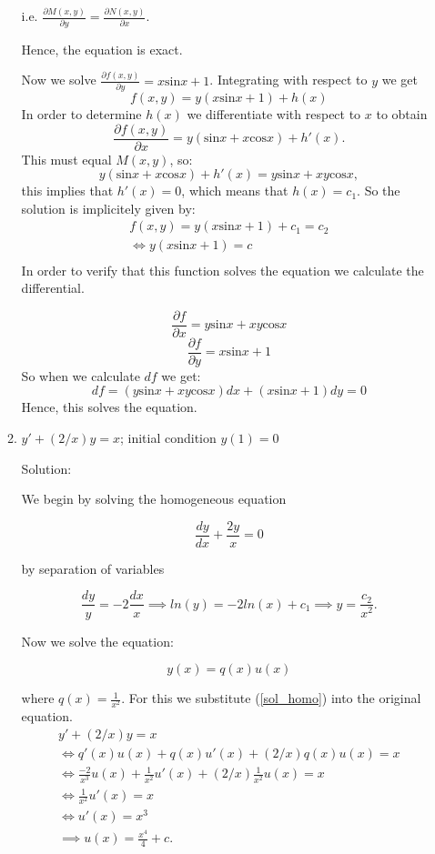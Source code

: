\documentclass{article}
\begin{document}
\begin{enumerate}
\begin{enumerate}
		i.e. $\frac{\partial M(x,y)}{\partial y} = \frac{\partial N(x,y)}{\partial x}$.

		Hence, the equation is exact.

		Now we solve $\frac{\partial f(x,y)}{\partial y} = x\text{sin}x + 1$. Integrating with respect to $y$ we get
		\[f(x,y) = y(x\text{sin}x +1) + h(x)\]
		In order to determine $h(x)$ we differentiate with
		respect to $x$ to obtain
		\[\frac{\partial f(x,y)}{\partial x} = y(\text{sin}x+x\text{cos}x) + h'(x).\]
		This must equal $M(x,y)$, so:
		\[y(\text{sin}x+x\text{cos}x) + h'(x) = y\text{sin}x + xy\text{cos}x,\]
		this implies that $h'(x)=0$, which means that $h(x) = c_1$.
		So the solution is implicitely given by:
		\begin{align*}
			f(x,y) = y(x\text{sin}x +1) + c_1 = c_2 \\
			\iff y(x\text{sin}x +1) = c \\
		\end{align*}
		In order to verify that this function solves the equation we calculate the differential.

		\[\frac{\partial f}{\partial x} = y\text{sin}x + xy\text{cos}x\]
		\[\frac{\partial f}{\partial y} = x\text{sin}x + 1\]
		So when we calculate $df$ we get:
		\[ df = (y\text{sin}x + xy\text{cos}x)dx + (x\text{sin}x + 1)dy =0\]
		Hence, this solves the equation.
		
	\item $y' + (2/x)y = x$; initial condition $y(1)=0$

		Solution:

		We begin by solving the homogeneous equation

		\[ \frac{dy}{dx} + \frac{2y}{x} = 0\]

		by separation of variables

		\[\frac{dy}{y} = -2\frac{dx}{x} \implies ln(y) = -2ln(x) + c_1 \implies y = \frac{c_2}{x^2}.\]

		Now we solve the equation:

		\begin{equation} \label{sol_homo}
			y(x) = q(x)u(x)
		\end{equation}

		where $q(x) = \frac{1}{x^2}$. For this we substitute (\ref{sol_homo}) into the original equation.
		\begin{align}
			y' + (2/x)y = x \nonumber \\
			\iff q'(x)u(x) +q(x)u'(x) + (2/x)q(x)u(x) = x \nonumber \\
			\iff \frac{-2}{x^3}	u(x) +\frac{1}{x^2}u'(x) + (2/x)\frac{1}{x^2}u(x) = x \nonumber \\
			\iff \frac{1}{x^2}u'(x) = x \nonumber \\
			\iff u'(x) = x^3 \nonumber \\
			\implies u(x) = \frac{x^4}{4} + c \label{ux}.
		\end{align}


\end{enumerate}
\end{enumerate}
\end{document}
